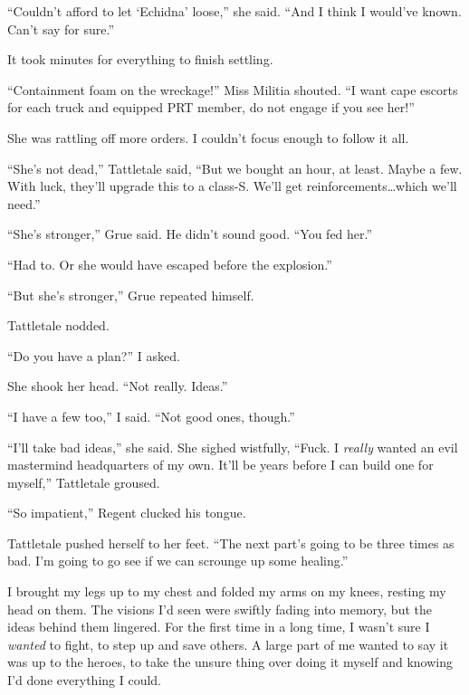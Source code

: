 ``Couldn't afford to let `Echidna' loose,'' she said.  ``And I think I would've known.  Can't say for sure.''



It took minutes for everything to finish settling.



``Containment foam on the wreckage!''  Miss Militia shouted.  ``I want cape escorts for each truck and equipped PRT member, do not engage if you see her!''



She was rattling off more orders.  I couldn't focus enough to follow it all.



``She's not dead,'' Tattletale said, ``But we bought an hour, at least.  Maybe a few.  With luck, they'll upgrade this to a class-S.  We'll get reinforcements\ldots which we'll need.''



``She's stronger,'' Grue said.  He didn't sound good.  ``You fed her.''



``Had to.  Or she would have escaped before the explosion.''



``But she's stronger,'' Grue repeated himself.



Tattletale nodded.



``Do you have a plan?'' I asked.



She shook her head.  ``Not really.  Ideas.''



``I have a few too,'' I said.  ``Not good ones, though.''



``I'll take bad ideas,'' she said.  She sighed wistfully, ``Fuck.  I \emph{really} wanted an evil mastermind headquarters of my own.  It'll be years before I can build one for myself,'' Tattletale groused.



``So impatient,'' Regent clucked his tongue.



Tattletale pushed herself to her feet.  ``The next part's going to be three times as bad.  I'm going to go see if we can scrounge up some healing.''



I brought my legs up to my chest and folded my arms on my knees, resting my head on them.  The visions I'd seen were swiftly fading into memory, but the ideas behind them lingered.  For the first time in a long time, I wasn't sure I \emph{wanted} to fight, to step up and save others.  A large part of me wanted to say it was up to the heroes, to take the unsure thing over doing it myself and knowing I'd done everything I could.




